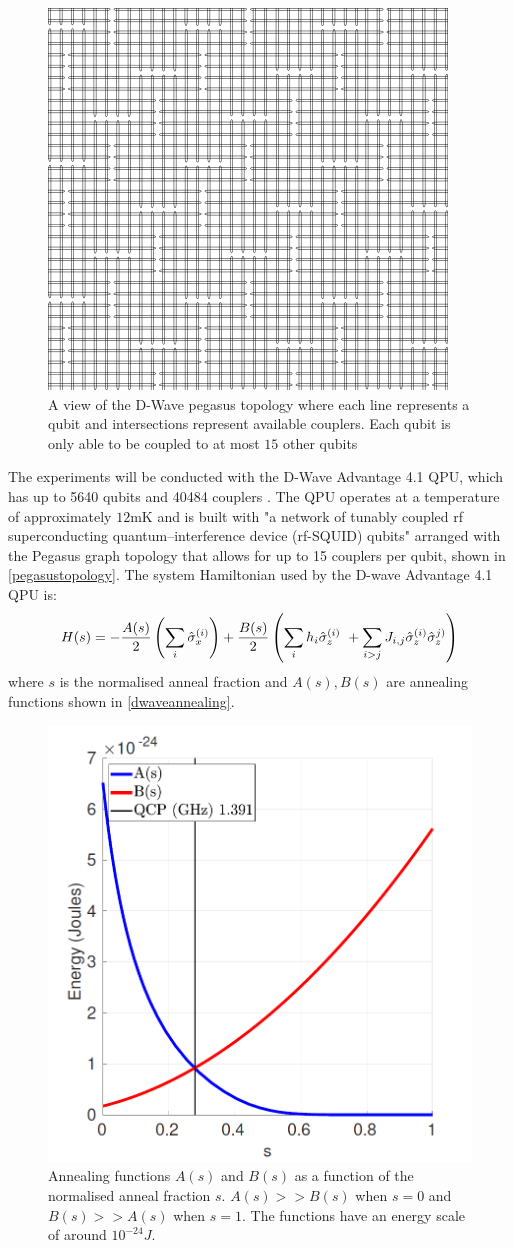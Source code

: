 \begin{figure}[h!]
    \centering
    \includegraphics[width=0.4\linewidth]{images/pegasus_topology.png}
    \caption[A view of the D-Wave pegasus topology---each line represents a qubit and intersections represent available couplers]{A view of the D-Wave pegasus topology where each line represents a qubit and intersections represent available couplers. Each qubit is only able to be coupled to at most $15$ other qubits~\protect\cite{dwaveadvantage}}
    \label{pegasustopology}
\end{figure}
The experiments will be conducted with the D-Wave Advantage 4.1 QPU, which has up to 5640 qubits and 40484 couplers \cite{dwaveadvantage}. The QPU operates at a temperature of approximately $12$mK and is built with "a network of tunably coupled rf superconducting quantum–interference device (rf-SQUID) qubits" arranged with the Pegasus graph topology that allows for up to 15 couplers per qubit, shown in \autoref{pegasustopology}. The system Hamiltonian used by the D-wave Advantage 4.1 QPU is:
\begin{equation}
    \label{eqn:dwavehamiltonian}
    H(s) = -\frac{A(s)}{2}\left(\sum_{i} \Hat{\sigma}_x^{(i)}\right) + \frac{B(s)}{2}\left(\sum_{i}h_i \Hat{\sigma}_z^{(i)}\ + \sum_{i > j}J_{i,j} \Hat{\sigma}_z^{(i)}\Hat{\sigma}_z^{j)}\right)
\end{equation}
where $s$ is the normalised anneal fraction and $A(s), B(s)$ are annealing functions shown in \autoref{dwaveannealing}.
\begin{figure}[h!]
    \centering
    \includegraphics[width=0.5\linewidth]{images/dwave_annealing.png}
    \caption[Annealing functions $A(s)$ and $B(s)$ as a function of the normalised anneal fraction $s$. $A(s) >> B(s)$ when $s=0$ and $B(s) >> A(s)$ when $s=1$. The functions have an energy scale of around $10^{-24} J$.]{Annealing functions $A(s)$ and $B(s)$ as a function of the normalised anneal fraction $s$. $A(s) >> B(s)$ when $s=0$ and $B(s) >> A(s)$ when $s=1$. The functions have an energy scale of around $10^{-24} J$. ~\protect\cite{dwaveadvantage}}
    \label{dwaveannealing}
\end{figure}
